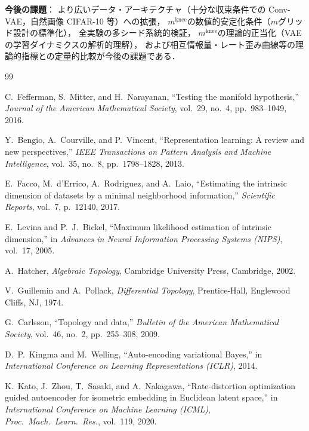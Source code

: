 \documentclass[11pt,a4paper]{jsarticle}
\newcommand{\mknee}{m^{\mathrm{knee}}}
\begin{document}
\textbf{今後の課題}：
より広いデータ・アーキテクチャ（十分な収束条件での Conv-VAE，自然画像 CIFAR-10 等）への拡張，
$\mknee$の数値的安定化条件（$m$グリッド設計の標準化），
全実験の多シード系統的検証，
$\mknee$の理論的正当化（VAE の学習ダイナミクスの解析的理解），
および相互情報量・レート歪み曲線等の理論的指標との定量的比較が今後の課題である．

\begin{thebibliography}{99}

C.~Fefferman, S.~Mitter, and H.~Narayanan,
``Testing the manifold hypothesis,''
\textit{Journal of the American Mathematical Society}, vol.~29, no.~4,
pp.~983--1049, 2016.

Y.~Bengio, A.~Courville, and P.~Vincent,
``Representation learning: A review and new perspectives,''
\textit{IEEE Transactions on Pattern Analysis and Machine Intelligence},
vol.~35, no.~8, pp.~1798--1828, 2013.

E.~Facco, M.~d'Errico, A.~Rodriguez, and A.~Laio,
``Estimating the intrinsic dimension of datasets by a minimal neighborhood information,''
\textit{Scientific Reports}, vol.~7, p.~12140, 2017.

E.~Levina and P.~J.~Bickel,
``Maximum likelihood estimation of intrinsic dimension,''
in \textit{Advances in Neural Information Processing Systems (NIPS)}, vol.~17, 2005.

A.~Hatcher,
\textit{Algebraic Topology},
Cambridge University Press, Cambridge, 2002.

V.~Guillemin and A.~Pollack,
\textit{Differential Topology},
Prentice-Hall, Englewood Cliffs, NJ, 1974.

G.~Carlsson,
``Topology and data,''
\textit{Bulletin of the American Mathematical Society},
vol.~46, no.~2, pp.~255--308, 2009.

D.~P.~Kingma and M.~Welling,
``Auto-encoding variational Bayes,''
in \textit{International Conference on Learning Representations (ICLR)}, 2014.

K.~Kato, J.~Zhou, T.~Sasaki, and A.~Nakagawa,
``Rate-distortion optimization guided autoencoder for isometric embedding
in Euclidean latent space,''
in \textit{International Conference on Machine Learning (ICML)},
\textit{Proc.~Mach.~Learn.~Res.}, vol.~119, 2020.


\end{thebibliography}
\end{document}
